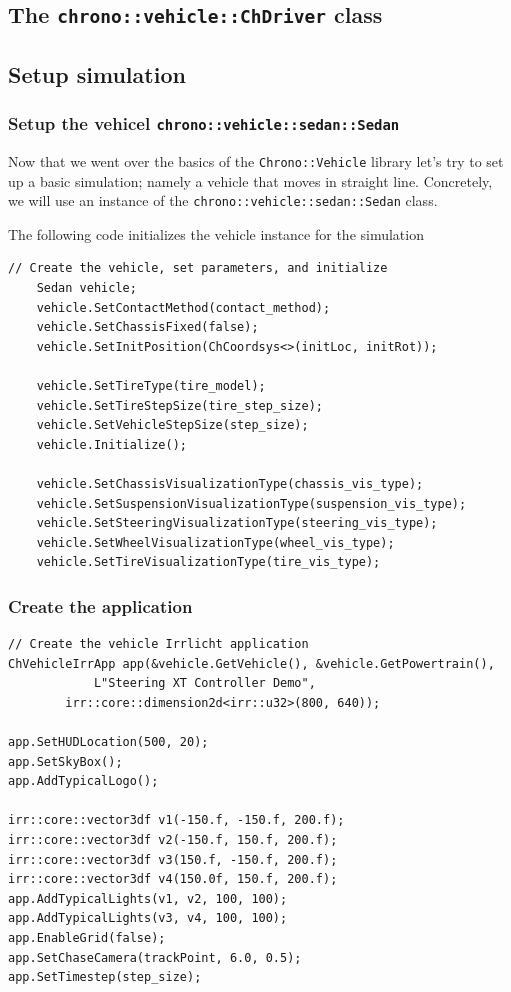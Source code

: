 \subsection{ The \lstinline{chrono::vehicle::ChDriver} class}

\subsection{Setup simulation}

\subsubsection{Setup the vehicel \lstinline{chrono::vehicle::sedan::Sedan}}

Now that we went over the basics of the \lstinline{Chrono::Vehicle} library let's try to set up a basic simulation; namely a vehicle that moves in straight line.
Concretely, we will use an instance of the \lstinline{chrono::vehicle::sedan::Sedan} class. 



The following code initializes the vehicle instance for the simulation

\begin{lstlisting}
// Create the vehicle, set parameters, and initialize
    Sedan vehicle;
    vehicle.SetContactMethod(contact_method);
    vehicle.SetChassisFixed(false);
    vehicle.SetInitPosition(ChCoordsys<>(initLoc, initRot));
    
    vehicle.SetTireType(tire_model);
    vehicle.SetTireStepSize(tire_step_size);
    vehicle.SetVehicleStepSize(step_size);
    vehicle.Initialize();

    vehicle.SetChassisVisualizationType(chassis_vis_type);
    vehicle.SetSuspensionVisualizationType(suspension_vis_type);
    vehicle.SetSteeringVisualizationType(steering_vis_type);
    vehicle.SetWheelVisualizationType(wheel_vis_type);
    vehicle.SetTireVisualizationType(tire_vis_type);
\end{lstlisting}


\subsubsection{Create the application}

\begin{lstlisting}
// Create the vehicle Irrlicht application
ChVehicleIrrApp app(&vehicle.GetVehicle(), &vehicle.GetPowertrain(), 
		    L"Steering XT Controller Demo", 
        irr::core::dimension2d<irr::u32>(800, 640));

app.SetHUDLocation(500, 20);
app.SetSkyBox();
app.AddTypicalLogo();

irr::core::vector3df v1(-150.f, -150.f, 200.f);
irr::core::vector3df v2(-150.f, 150.f, 200.f);
irr::core::vector3df v3(150.f, -150.f, 200.f);
irr::core::vector3df v4(150.0f, 150.f, 200.f); 
app.AddTypicalLights(v1, v2, 100, 100);
app.AddTypicalLights(v3, v4, 100, 100);
app.EnableGrid(false);
app.SetChaseCamera(trackPoint, 6.0, 0.5);
app.SetTimestep(step_size);
\end{lstlisting}


